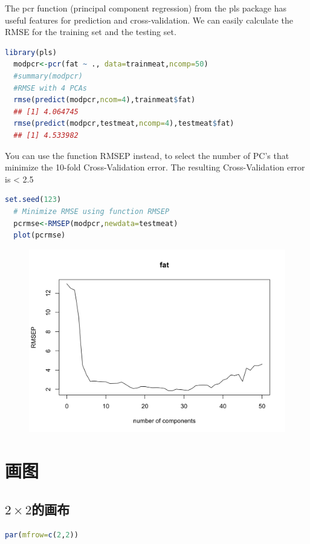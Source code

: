 \documentclass[11pt,a4paper]{article}
\begin{document}
The pcr function (principal component regression) from the pls package has useful features for prediction and cross-validation. We can easily calculate the RMSE for the training set and the testing set.
\begin{lstlisting}[language=R]
  library(pls)
  modpcr<-pcr(fat ~ ., data=trainmeat,ncomp=50)
  #summary(modpcr)
  #RMSE with 4 PCAs
  rmse(predict(modpcr,ncom=4),trainmeat$fat) 
  ## [1] 4.064745
  rmse(predict(modpcr,testmeat,ncomp=4),testmeat$fat)
  ## [1] 4.533982
\end{lstlisting}
You can use the function RMSEP instead, to select the number of PC’s that minimize the 10-fold Cross-Validation error. The resulting Cross-Validation error is < 2.5
\begin{lstlisting}[language=R]
  set.seed(123)
  # Minimize RMSE using function RMSEP
  pcrmse<-RMSEP(modpcr,newdata=testmeat)
  plot(pcrmse)  
\end{lstlisting}
\begin{center}\begin{figure}[htbp]
  \centering
  \includegraphics[scale=0.3]{fat}
  \caption{}
  \label{}
\end{figure}\end{center}









\section{画图}

\subsection{$2\times2$的画布}
\begin{lstlisting}[language=R]
par(mfrow=c(2,2))
\end{lstlisting}
\end{document}
